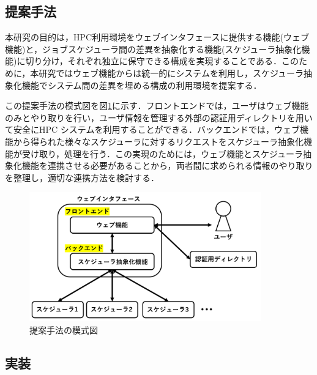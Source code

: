 \subsection{提案手法}
本研究の目的は，HPC利用環境をウェブインタフェースに提供する機能(ウェブ機能)と，ジョブスケジューラ間の差異を抽象化する機能(スケジューラ抽象化機能)に切り分け，それぞれ独立に保守できる構成を実現することである．このために，本研究ではウェブ機能からは統一的にシステムを利用し，スケジューラ抽象化機能でシステム間の差異を埋める構成の利用環境を提案する．\par
この提案手法の模式図を図\ref{fig6}に示す．フロントエンドでは，ユーザはウェブ機能のみとやり取りを行い，ユーザ情報を管理する外部の認証用ディレクトリを用いて安全にHPC システムを利用することができる．バックエンドでは，ウェブ機能から得られた様々なスケジューラに対するリクエストをスケジューラ抽象化機能が受け取り，処理を行う．この実現のためには，ウェブ機能とスケジューラ抽象化機能を連携させる必要があることから，両者間に求められる情報のやり取りを整理し，適切な連携方法を検討する．\par

\begin{figure}[tb]
    \centering
    \includegraphics[width=100mm]{./fig/proposed_method.png}
    \caption{提案手法の模式図}
    \label{fig6}
\end{figure}

\subsection{実装}
